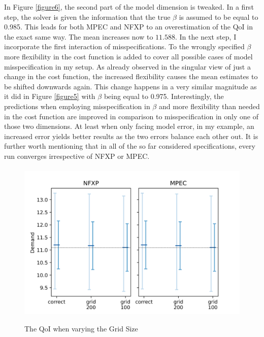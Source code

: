 In Figure \ref{figure6}, the second part of the model dimension is tweaked. In a first step, the solver is given the information that the true $\beta$ is assumed to be equal to 0.985. This leads for both MPEC and NFXP to an overestimation of the QoI in the exact same way. The mean increases now to $11.588$. In the next step, I incorporate the first interaction of misspecifications. To the wrongly specified $\beta$ more flexibility in the cost function is added to cover all possible cases of model misspecification in my setup. As already observed in the singular view of just a change in the cost function, the increased flexibility causes the mean estimates to be shifted downwards again. This change happens in a very similar magnitude as it did in Figure \ref{figure5} with $\beta$ being equal to 0.975. Interestingly, the predictions when employing misspecification in $\beta$ and more flexibility than needed in the cost function are improved in comparison to misspecification in only one of those two dimensions. At least when only facing model error, in my example, an increased error yields better results as the two errors balance each other out. It is further worth mentioning that in all of the so far considered specifications, every run converges irrespective of NFXP or MPEC. \paragraph{}

\begin{figure}[!b]
	\caption{The QoI when varying the Grid Size}
	\vspace*{-4mm}
	\centering
	\includegraphics[scale=0.9]{../figures/figure_7.png}
	\label{figure7}
\end{figure}

